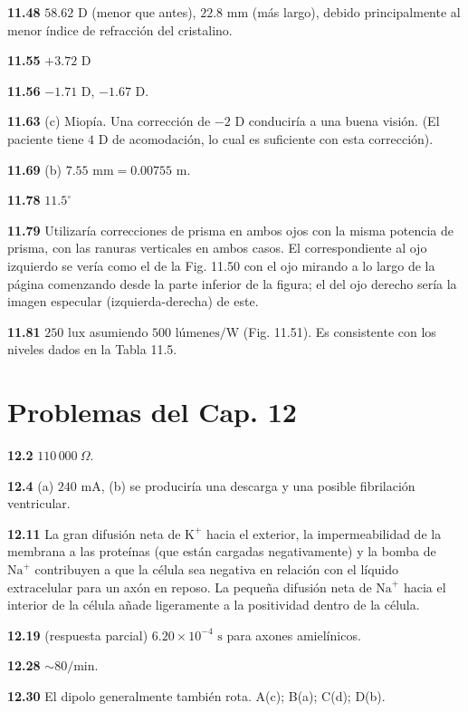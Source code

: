 \documentclass[12pt,a4paper]{book}
\begin{document}
\noindent \textbf{11.48} $58.62\text{ D}$ (menor que antes), $22.8\text{ mm}$ (más largo), debido principalmente al menor índice de refracción del cristalino.

\noindent \textbf{11.55} $+3.72\text{ D}$

\noindent \textbf{11.56} $-1.71\text{ D}$, $-1.67\text{ D}$.

\noindent \textbf{11.63} (c) Miopía. Una corrección de $-2\text{ D}$ conduciría a una buena visión. (El paciente tiene $4\text{ D}$ de acomodación, lo cual es suficiente con esta corrección).

\noindent \textbf{11.69} (b) $7.55\text{ mm} = 0.00755\text{ m}$.

\noindent \textbf{11.78} $11.5^\circ$

\noindent \textbf{11.79} Utilizaría correcciones de prisma en ambos ojos con la misma potencia de prisma, con las ranuras verticales en ambos casos. El correspondiente al ojo izquierdo se vería como el de la Fig. 11.50 con el ojo mirando a lo largo de la página comenzando desde la parte inferior de la figura; el del ojo derecho sería la imagen especular (izquierda-derecha) de este.

\noindent \textbf{11.81} $250\text{ lux}$ asumiendo $500\text{ lúmenes/W}$ (Fig. 11.51). Es consistente con los niveles dados en la Tabla 11.5.

\section*{Problemas del Cap. 12}

\noindent \textbf{12.2} $110\,000\ \Omega$.

\noindent \textbf{12.4} (a) $240\text{ mA}$, (b) se produciría una descarga y una posible fibrilación ventricular.

\noindent \textbf{12.11} La gran difusión neta de $\text{K}^+$ hacia el exterior, la impermeabilidad de la membrana a las proteínas (que están cargadas negativamente) y la bomba de $\text{Na}^+$ contribuyen a que la célula sea negativa en relación con el líquido extracelular para un axón en reposo. La pequeña difusión neta de $\text{Na}^+$ hacia el interior de la célula añade ligeramente a la positividad dentro de la célula.

\noindent \textbf{12.19} (respuesta parcial) $6.20 \times 10^{-4}\text{ s}$ para axones amielínicos.

\noindent \textbf{12.28} $\sim 80/\text{min}$.

\noindent \textbf{12.30} El dipolo generalmente también rota. A(c); B(a); C(d); D(b).
\end{document}
